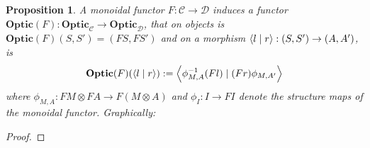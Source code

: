 \documentclass[11pt,letterpaper]{article}
\theoremstyle{plain}
\newtheorem{proposition}[theorem]{Proposition}
\theoremstyle{definition}
\newcommand{\C}{\mathscr{C}}
\newcommand{\D}{\mathscr{D}}
\newcommand{\Optic}{\mathbf{Optic}}
\newcommand{\rep}[2]{{\ensuremath \left\langle #1 \mid #2 \right\rangle}}
\begin{document}
\begin{proposition}\label{prop:change-of-action-monoidal}
  A monoidal functor $F : \C \to \D$ induces a functor $\Optic(F) : \Optic_\C \to \Optic_\D$, that on objects is $\Optic(F)(S, S') = (FS, FS')$ and on a morphism $\rep{l}{r} : (S, S') \to (A, A')$, is
  \begin{align*}
    \Optic(F)(\rep{l}{r}) := \rep{\phi^{-1}_{M,A} (Fl)}{(Fr) \phi_{M,A'}}
  \end{align*}
  where $\phi_{M,A} : FM \otimes FA \to F(M \otimes A)$ and $\phi_I : I \to FI$ denote the structure maps of the monoidal functor. Graphically:
  \begin{center}
    
  \end{center}
\end{proposition}
\begin{proof}


\end{proof}
\end{document}
